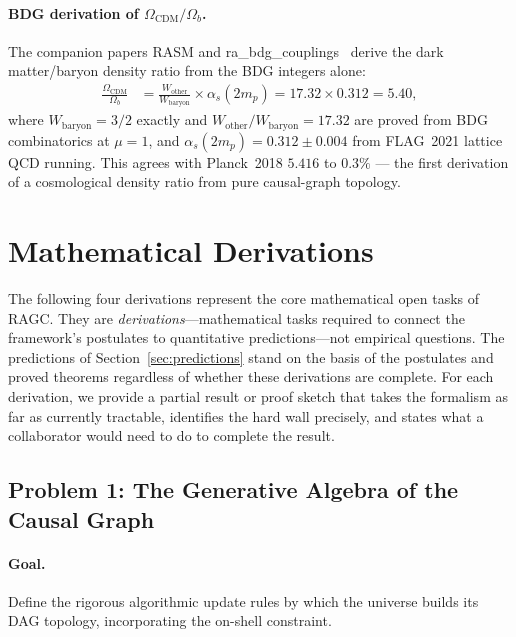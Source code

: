 \documentclass[11pt,a4paper]{article}
\theoremstyle{plain}
\theoremstyle{definition}
\theoremstyle{remark}
\begin{document}
\paragraph{BDG derivation of $\Omega_{\mathrm{CDM}}/\Omega_b$.}
The companion papers RASM and ra\_bdg\_couplings~\citep{Sandeman2026RASM,Sandeman2026BDG}
derive the dark matter/baryon density ratio from the BDG integers alone:
\begin{align}
  \frac{\Omega_{\mathrm{CDM}}}{\Omega_b}
  &= \frac{W_{\mathrm{other}}}{W_{\mathrm{baryon}}} \times \alpha_s(2m_p)
   = 17.32 \times 0.312 = 5.40,
  \label{eq:f0_ragc}
\end{align}
where $W_{\mathrm{baryon}} = 3/2$ exactly and $W_{\mathrm{other}}/W_{\mathrm{baryon}} = 17.32$
are proved from BDG combinatorics at $\mu=1$, and $\alpha_s(2m_p) = 0.312\pm
0.004$ from FLAG~2021 lattice QCD running.  This agrees with Planck~2018
$5.416$ to $0.3\%$ --- the first derivation of a cosmological density ratio
from pure causal-graph topology.

\section{Mathematical Derivations}
\label{sec:math}

The following four derivations represent the core mathematical open tasks of
RAGC. They are \emph{derivations}---mathematical tasks required to connect the
framework's postulates to quantitative predictions---not empirical questions.
The predictions of Section~\ref{sec:predictions} stand on the basis of the
postulates and proved theorems regardless of whether these derivations are complete.
For each derivation, we provide a partial result or proof sketch that takes the
formalism as far as currently tractable, identifies the hard wall precisely, and
states what a collaborator would need to do to complete the result.

\subsection{Problem 1: The Generative Algebra of the Causal Graph}
\label{sec:algebra}

\paragraph{Goal.} Define the rigorous algorithmic update rules by which the
universe builds its DAG topology, incorporating the on-shell constraint.
\end{document}
